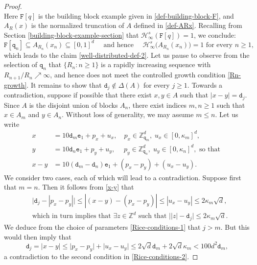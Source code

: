 \documentclass[a4paper,11pt]{amsart}
\numberwithin{equation}{section}
\begin{document}
\begin{proof}
\begin{equation*}
\end{equation*}
Here $\mathtt F[q]$ is the building block example given in \eqref{def-building-block-F}, and $A_R(x)$ is the normalized truncation of $A$ defined in \eqref{def-ARx}. Recalling from Section \ref{building-block-example-section} that $\mathcal H_{\infty}^{s}(\mathtt F[q]) = 1$, we conclude:
\[ \mathtt F[\mathtt q_n] \subseteq A_{R_n}(x_n)  \subseteq [0,1]^d \quad \text{ and hence } \quad  \mathcal H_{\infty}^s \bigl(A_{R_n}(x_n) \bigr) =1 \text{ for every $n \geq 1$},  \]
which leads to the claim \eqref{well-distributed-def-2}. Let us pause to observe from the selection of $\mathtt q_n$ that $\{R_n : n \geq 1\}$ is a rapidly increasing sequence  with $R_{n+1}/R_n \nearrow \infty$, and hence does not meet the controlled growth condition \eqref{Rn-growth}. 
\vskip0.1in
\noindent It remains to show that $\mathtt d_j \notin \Delta(A)$ for every $j \geq 1$. Towards a contradiction, suppose if possible that there exist $x, y \in A$ such that $|x - y| = \mathtt d_j$. Since $A$ is the disjoint union of blocks $A_n$, there exist indices $m, n \geq 1$ such that $x \in A_m$ and $y \in A_n$. Without loss of generality, we may assume $m \leq n$. Let us write
\begin{align}  x &=10  \mathtt d_m \mathtt e_1  + p_x + u_x, \quad p_x \in \mathbb Z_{\mathtt q_m}^d, \; u_x \in [0, \kappa_m]^d,  \nonumber \\ 
y &= 10 \mathtt d_n \mathtt e_1 + p_y + u_y, \quad \; p_y \in \mathbb Z_{\mathtt q_n}^d, \;  u_y \in [0, \kappa_n]^d, \text{ so that }  \nonumber \\ 
x - y &= 10 (\mathtt d_m - \mathtt d_n) \mathtt e_1 + (p_x - p_y) + (u_x - u_y).  \label{x-y} 
\end{align} 
We consider two cases, each of which will lead to a contradiction. Suppose first that $m = n$. Then it follows from \eqref{x-y} that
\begin{align*} 
&\bigl| \mathtt d_j - |p_x - p_y| \bigr| \leq |(x - y) - (p_x - p_y)| \leq |u_x - u_y|  \leq 2 \kappa_m \sqrt{d}, \\ &\text{which in turn implies that }   \exists z \in \mathbb Z^d \text{ such that } \bigl||z| - \mathtt d_j \bigr| \leq 2 \kappa_m \sqrt{d}.  
\end{align*} 
We deduce from the choice of parameters \eqref{Rice-conditions-1} that $j > m$. But this would then imply that 
\[ \mathtt d_j = |x - y| \leq  \bigl| p_x - p_y  \bigr| + \bigl| u_x - u_y  \bigr| \leq 2 \sqrt{d} \mathtt d_m + 2 \sqrt{d} \kappa_m < 100 d^2 \mathtt d_m, \]  
a contradiction to the second condition in \eqref{Rice-conditions-2}.

\end{proof}
\end{document}
